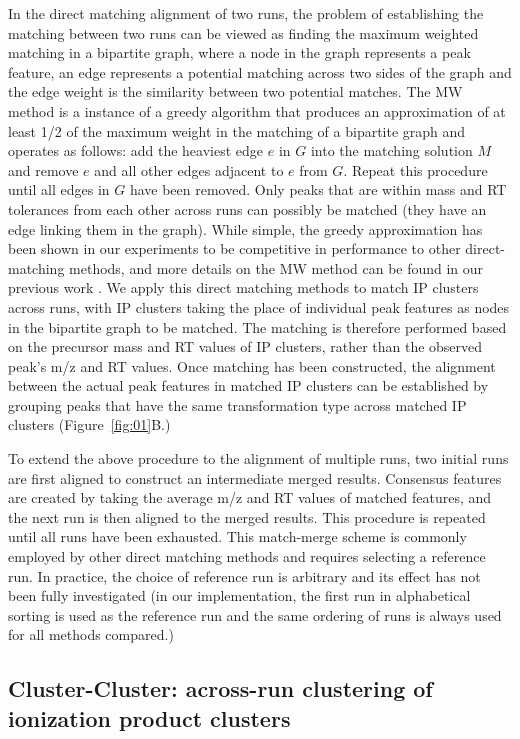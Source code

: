 In the direct matching alignment of two runs, the problem of establishing the matching between two runs can be viewed as finding the maximum weighted matching in a bipartite graph, where a node in the graph represents a peak feature, an edge represents a potential matching across two sides of the graph and the edge weight is the similarity between two potential matches. The MW method \cite{Wandy2015} is a instance of a greedy algorithm that produces an approximation of at least 1/2 of the maximum weight in the matching of a bipartite graph \cite{Maximum2011} and operates as follows: add the heaviest edge $e$ in $G$ into the matching solution $M$ and remove $e$ and all other edges adjacent to $e$ from $G$. Repeat this procedure until all edges in $G$ have been removed. Only peaks that are within mass and RT tolerances from each other across runs can possibly be matched (they have an edge linking them in the graph). While simple, the greedy approximation has been shown in our experiments to be competitive in performance to other direct-matching methods, and more details on the MW method can be found in our previous work \cite{Wandy2015}. We apply this direct matching methods to match IP clusters across runs, with IP clusters taking the place of individual peak features as nodes in the bipartite graph to be matched. The matching is therefore performed based on the precursor mass and RT values of IP clusters, rather than the observed peak's m/z and RT values. Once matching has been constructed, the alignment between the actual peak features in matched IP clusters can be established by grouping peaks that have the same transformation type across matched IP clusters (Figure~\ref{fig:01}B.)

To extend the above procedure to the alignment of multiple runs, two initial runs are first aligned to construct an intermediate merged results. Consensus features are created by taking the average m/z and RT values of matched features, and the next run is then aligned to the merged results. This procedure is repeated until all runs have been exhausted. This match-merge scheme is commonly employed by other direct matching methods \cite{Voss2011a, Pluskal2010} and requires selecting a reference run. In practice, the choice of reference run is arbitrary and its effect has not been fully investigated (in our implementation, the first run in alphabetical sorting is used as the reference run and the same ordering of runs is always used for all methods compared.)

\subsection{Cluster-Cluster: across-run clustering of ionization product clusters\label{sub:cluster-cluster}}

